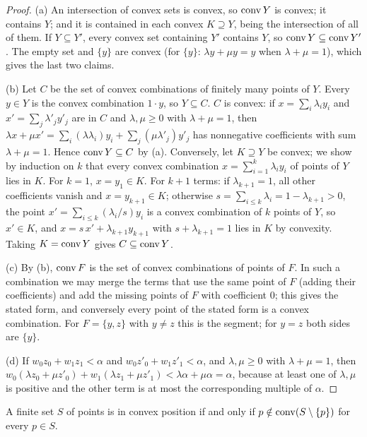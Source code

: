 \begin{proof}
(a) An intersection of convex sets is convex, so $\operatorname{conv} Y$ is convex; it contains $Y$; and it is contained
in each convex $K\supseteq Y$, being the intersection of all of them. If $Y\subseteq Y'$, every convex
set containing $Y'$ contains $Y$, so $\operatorname{conv} Y\subseteq\operatorname{conv} Y'$. The empty set and $\{y\}$ are convex
(for $\{y\}$: $\lambda y+\mu y=y$ when $\lambda+\mu=1$), which gives the last two claims.

(b) Let $C$ be the set of convex combinations of finitely many points of $Y$. Every $y\in Y$ is the convex
combination $1\cdot y$, so $Y\subseteq C$. $C$ is convex: if $x=\sum_i\lambda_iy_i$ and
$x'=\sum_j\lambda'_jy'_j$ are in $C$ and $\lambda,\mu\ge0$ with $\lambda+\mu=1$, then
$\lambda x+\mu x'=\sum_i(\lambda\lambda_i)y_i+\sum_j(\mu\lambda'_j)y'_j$ has nonnegative coefficients
with sum $\lambda+\mu=1$. Hence $\operatorname{conv} Y\subseteq C$ by (a). Conversely, let $K\supseteq Y$ be convex; we
show by induction on $k$ that every convex combination $x=\sum_{i=1}^k\lambda_iy_i$ of points of $Y$
lies in $K$. For $k=1$, $x=y_1\in K$. For $k+1$ terms: if $\lambda_{k+1}=1$, all other coefficients
vanish and $x=y_{k+1}\in K$; otherwise $s=\sum_{i\le k}\lambda_i=1-\lambda_{k+1}>0$, the point
$x'=\sum_{i\le k}(\lambda_i/s)y_i$ is a convex combination of $k$ points of $Y$, so $x'\in K$, and
$x=s\,x'+\lambda_{k+1}y_{k+1}$ with $s+\lambda_{k+1}=1$ lies in $K$ by convexity. Taking $K=\operatorname{conv} Y$
gives $C\subseteq\operatorname{conv} Y$.

(c) By (b), $\operatorname{conv} F$ is the set of convex combinations of points of $F$. In such a combination we may
merge the terms that use the same point of $F$ (adding their coefficients) and add the missing points of
$F$ with coefficient $0$; this gives the stated form, and conversely every point of the stated form is a
convex combination. For $F=\{y,z\}$ with $y\ne z$ this is the segment; for $y=z$ both sides are $\{y\}$.

(d) If $w_0z_0+w_1z_1<\alpha$ and $w_0z'_0+w_1z'_1<\alpha$, and $\lambda,\mu\ge0$ with $\lambda+\mu=1$,
then $w_0(\lambda z_0+\mu z'_0)+w_1(\lambda z_1+\mu z'_1)<\lambda\alpha+\mu\alpha=\alpha$, because at least
one of $\lambda,\mu$ is positive and the other term is at most the corresponding multiple of $\alpha$.
\end{proof}

\begin{lemma}\label{fd:lem:cp-hull}\sloppy
A finite set $S$ of points is in convex position if and only if $p\notin\operatorname{conv}(S\setminus\{p\})$ for
every $p\in S$.
\end{lemma}

